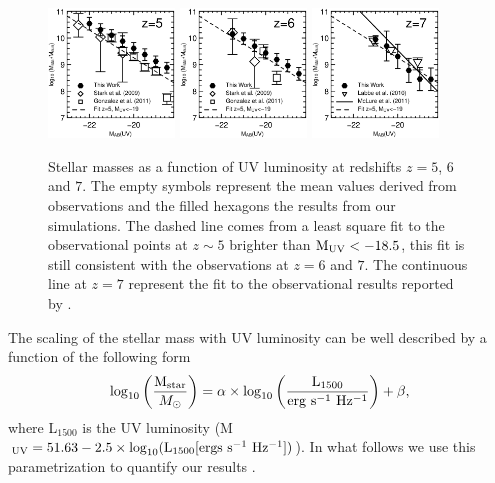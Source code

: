 \documentclass{emulateapj}
\begin{document}
\begin{figure}
\includegraphics[width=0.30\textwidth]{./mstar_z5.ps}\hspace{0.2cm}
\includegraphics[width=0.30\textwidth]{./mstar_z6.ps}\hspace{0.2cm}
\includegraphics[width=0.30\textwidth]{./mstar_z7.ps}
\caption{
\label{fig:mass_lum}
Stellar masses as a function of UV luminosity at redshifts $z = 5$, $6$ and
$7$. The empty  symbols represent the mean values derived from observations
\citep{2009ApJ...697.1493S,2010ApJ...716L.103L,2011ApJ...735L..34G} and the
filled hexagons the results from our simulations.  The dashed line
comes from a least square fit to the observational points at $z\sim 5$
brighter than $\mathrm{M_{\rm UV}}<-18.5$, this fit is still consistent
with the observations at $z=6$ and $7$. The continuous line at
$z=7$ represent the fit to the observational results reported by
\citet{2011MNRAS.418.2074M}.}

\end{figure}

The scaling of the stellar mass with UV luminosity can be well described by a
function of the following form
\begin{equation}
\log_{10}\left(\frac{{\rm M_{star}}}{M_{\odot}}\right) = \alpha \times
\log_{10}\left(\frac{\mathrm{L}_{1500}}{\mathrm{erg\ s^{-1}\ Hz^{-1}}}\right)
+ \beta,
\label{eq:fit}
\end{equation}
%
where L$_{1500}$ is the UV luminosity (M$_{\rm UV}=51.63 - 2.5\times
\log_{10} ({\mathrm{L}}_{1500}[\mathrm{ergs\ s^{-1}\ Hz^{-1}}])$). In
what follows we use this parametrization to quantify our results
\citep{2011ApJ...735L..34G,2011MNRAS.418.2074M}. 
\end{document}
